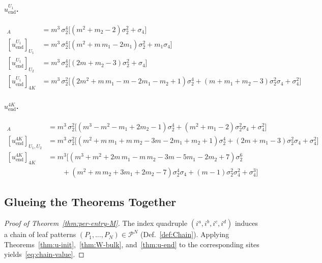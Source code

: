 \documentclass[12pt,a4paper]{article}
\begin{document}
\paragraph{$u^{U_{1}}_{\mathrm{end}}$.}
\begin{align*}
[u^{U_{1}}_{\mathrm{end}}]_{A}
  &= m^{3}\,\sigma_{2}^{4}\bigl[(m^{2} + m_{2} - 2)\sigma_{2}^{2} + \sigma_{4}\bigr]\\
[u^{U_{1}}_{\mathrm{end}}]_{U_{1}}
  &= m^{3}\,\sigma_{2}^{4}\bigl[(m^{2} + m\,m_{1} - 2m_{1})\sigma_{2}^{2} + m_{1}\sigma_{4}\bigr]\\
[u^{U_{1}}_{\mathrm{end}}]_{U_{2}}
  &= m^{3}\,\sigma_{2}^{4}\bigl[(2m + m_{2} - 3)\sigma_{2}^{2} + \sigma_{4}\bigr]\\
[u^{U_{1}}_{\mathrm{end}}]_{4K}
  &= m^{3}\,\sigma_{2}^{2}\bigl[
       (2m^{2} + m\,m_{1} - m - 2m_{1} - m_{2} + 1)\sigma_{2}^{4}
       + (m + m_{1} + m_{2} - 3)\sigma_{2}^{2}\sigma_{4} + \sigma_{4}^{2}\bigr]
\end{align*}

\paragraph{$u^{4K}_{\mathrm{end}}$.}
\begin{align*}
[u^{4K}_{\mathrm{end}}]_{A}
  &= m^{3}\,\sigma_{2}^{2}\bigl[
       (m^{3} - m^{2} - m_{1} + 2m_{2} - 1)\sigma_{2}^{4}
       + (m^{2} + m_{1} - 2)\sigma_{2}^{2}\sigma_{4} + \sigma_{4}^{2}\bigr]\\
[u^{4K}_{\mathrm{end}}]_{U_{1}, U_{2}}
  &= m^{3}\,\sigma_{2}^{2}\bigl[
       (m^{2} + m\,m_{1} + m\,m_{2} - 3m - 2m_{1} + m_{2} + 1)\sigma_{2}^{4}
       + (2m + m_{1} - 3)\sigma_{2}^{2}\sigma_{4} + \sigma_{4}^{2}\bigr]\\
[u^{4K}_{\mathrm{end}}]_{4K}
  &= m^{3}\bigl[
       (m^{3} + m^{2} + 2m\,m_{1} - m\,m_{2} - 3m - 5m_{1} - 2m_{2} + 7)\sigma_{2}^{6}\\
  &\hspace{2em}
       + (m^{2} + m\,m_{2} + 3m_{1} + 2m_{2} - 7)\sigma_{2}^{4}\sigma_{4}
       + (m - 1)\sigma_{2}^{2}\sigma_{4}^{2} + \sigma_{4}^{3}\bigr]
\end{align*}
\subsection{Glueing the Theorems Together}
\begin{proof}[Proof of Theorem~\ref{thm:per-entry-M}]
The index quadruple $(i^{a},i^{b},i^{c},i^{d})$ induces a chain of leaf patterns $(P_{1},\dots,P_{N})\in\mathcal{P}^{N}$ (Def.~\ref{def:Chain}). Applying Theorems~\ref{thm:u-init},~\ref{thm:W-bulk}, and~\ref{thm:u-end} to the corresponding sites yields~\eqref{eq:chain-value}.
\end{proof}
\pagebreak
\end{document}
